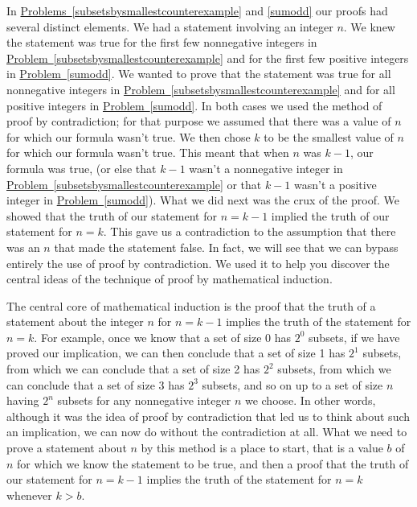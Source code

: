 \documentclass[10pt,]{book}
\theoremstyle{plain}
\theoremstyle{definition}
\theoremstyle{definition}
\numberwithin{equation}{chapter}
\begin{document}
\hypertarget{p-1991}{}%
In \hyperref[subsetsbysmallestcounterexample]{Problems~\ref{subsetsbysmallestcounterexample}} and \hyperref[sumodd]{\ref{sumodd}} our proofs had several distinct elements. We had a statement involving an integer \(n\). We knew the statement was true for the first few nonnegative integers in \hyperref[subsetsbysmallestcounterexample]{Problem~\ref{subsetsbysmallestcounterexample}} and for the first few positive integers in \hyperref[sumodd]{Problem~\ref{sumodd}}. We wanted to prove that the statement was true for all nonnegative integers in \hyperref[subsetsbysmallestcounterexample]{Problem~\ref{subsetsbysmallestcounterexample}} and for all positive integers in \hyperref[sumodd]{Problem~\ref{sumodd}}. In both cases we used the method of proof by contradiction; for that purpose we assumed that there was a value of \(n\) for which our formula wasn't true. We then chose \(k\) to be the smallest value of \(n\) for which our formula wasn't true. This meant that when \(n\) was \(k-1\), our formula was true, (or else that \(k-1\) wasn't a nonnegative integer in \hyperref[subsetsbysmallestcounterexample]{Problem~\ref{subsetsbysmallestcounterexample}} or that \(k-1\) wasn't a positive integer in \hyperref[sumodd]{Problem~\ref{sumodd}}). What we did next was the crux of the proof. We showed that the truth of our statement for \(n=k-1\) implied the truth of our statement for \(n=k\). This gave us a contradiction to the assumption that there was an \(n\) that made the statement false. In fact, we will see that we can bypass entirely the use of proof by contradiction. We used it to help you discover the central ideas of the technique of proof by mathematical induction.%
\par
\hypertarget{p-1992}{}%
The central core of mathematical induction is the proof that the truth of a statement about the integer \(n\) for \(n=k-1\) implies the truth of the statement for \(n=k\). For example, once we know that a set of size 0 has \(2^0\) subsets, if we have proved our implication, we can then conclude that a set of size 1 has \(2^1\) subsets, from which we can conclude that a set of size 2 has \(2^2\) subsets, from which we can conclude that a set of size 3 has \(2^3\) subsets, and so on up to a set of size \(n\) having \(2^n\) subsets for any nonnegative integer \(n\) we choose. In other words, although it was the idea of proof by contradiction that led us to think about such an implication, we can now do without the contradiction at all. What we need to prove a statement about \(n\) by this method is a place to start, that is a value \(b\) of \(n\) for which we know the statement to be true, and then a proof that the truth of our statement for \(n=k-1\) implies the truth of the statement for \(n=k\) whenever \(k>b\).%
\typeout{************************************************}
\typeout{************************************************}
\end{document}
